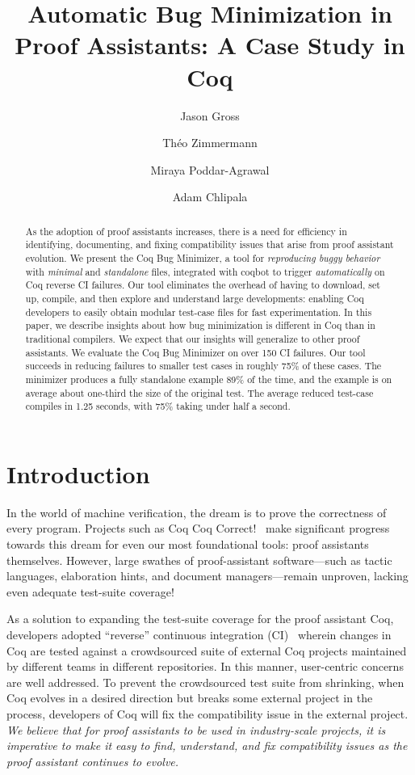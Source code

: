 \documentclass[a4paper,USenglish,cleveref,autoref,thm-restate]{lipics-v2021}
\title{Automatic Bug Minimization in Proof Assistants: A Case Study in Coq}
\author{Jason Gross}{CSAIL, Massachusetts Institute of Technology, 77 Massachusetts Ave., Cambridge, MA 02139, USA \and MIRI, USA \and \url{https://jasongross.github.io/} }{jgross@mit.edu}{https://orcid.org/0000-0002-9427-4891}{}%
\author{Théo Zimmermann}{Inria, Université de Paris, CNRS, IRIF, F-75013, Paris, France \and \url{https://www.theozimmermann.net} }{theo@irif.fr}{https://orcid.org/0000-0002-3580-8806}{}
\author{Miraya Poddar-Agrawal}{Reed College, 3203 SE Woodstock Blvd, Portland, OR 97202, USA%
}{ragrawal@reed.edu}{https://orcid.org/0000-0001-7617-9180}{}
\author{Adam Chlipala}{CSAIL, Massachusetts Institute of Technology, 77 Massachusetts Ave., Cambridge, MA 02139, USA \and \url{http://adam.chlipala.net/} }{adamc@csail.mit.edu}{https://orcid.org/0000-0001-7085-9417}{}
\begin{document}
\maketitle

\begin{abstract}
  As the adoption of proof assistants increases, there is a need for efficiency in identifying, documenting, and fixing compatibility issues that arise from proof assistant evolution.
  We present the Coq Bug Minimizer, a tool for \emph{reproducing buggy behavior} with \emph{minimal} and \emph{standalone} files, integrated with coqbot to trigger \emph{automatically} on Coq reverse CI failures.
  Our tool eliminates the overhead of having to download, set up, compile, and then explore and understand large developments: enabling Coq developers to easily obtain modular test-case files for fast experimentation.
  In this paper, we describe insights about how bug minimization is different in Coq than in traditional compilers.
We expect that our insights will generalize to other proof assistants.
  We evaluate the Coq Bug Minimizer on over 150 CI failures.
  Our tool succeeds in reducing failures to smaller test cases in roughly 75\% of these cases.
  The minimizer produces a fully standalone example 89\% of the time, and the example is on average about one-third the size of the original test.
  The average reduced test-case compiles in 1.25 seconds, with 75\% taking under half a second.
\end{abstract}

\section{Introduction}

In the world of machine verification, the dream is to prove the correctness of every program.
Projects such as Coq Coq Correct!~\cite{coq-coq-correct} make significant progress towards this dream for even our most foundational tools: proof assistants themselves.
However, large swathes of proof-assistant software—such as tactic languages, elaboration hints, and document managers—remain unproven, lacking even adequate test-suite coverage!

As a solution to expanding the test-suite coverage for the proof assistant Coq, developers adopted ``reverse'' continuous integration (CI)~\cite{zimmermann:tel-02451322,ochoa2022breakbot} wherein changes in Coq are tested against a crowdsourced suite of external Coq projects maintained by different teams in different repositories.
In this manner, user-centric concerns are well addressed.
To prevent the crowdsourced test suite from shrinking, when Coq evolves in a desired direction but breaks some external project in the process, developers of Coq will fix the compatibility issue in the external project.
\emph{We believe that for proof assistants to be used in industry-scale projects, it is imperative to make it easy to find, understand, and fix compatibility issues as the proof assistant continues to evolve.}
\end{document}
